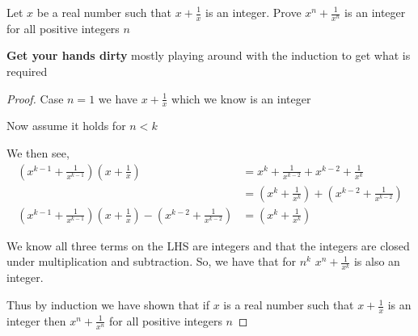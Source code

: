 \documentclass[11pt]{article}
\newenvironment{problem}[2][Problem\!]{\begin{trivlist}
\item[\hskip \labelsep {\bfseries #1}\hskip \labelsep {\bfseries #2}]}{\end{trivlist}}
\begin{document}
\begin{tcolorbox}
    \begin{problem}{IC | 9/29 | 14.}
        Let $x$ be a real number such that $x + \frac{1}{x}$ is an integer. Prove $x^n + \frac{1}{x^n}$ is an integer for all positive integers $n$
    \end{problem}
    \textbf{Get your hands dirty} mostly playing around with the induction to get what is required
\end{tcolorbox}
\begin{proof}
    Case $n = 1$ we have $x + \frac{1}{x}$ which we know is an integer

    Now assume it holds for $n < k$

    We then see,
    \begin{align*}
        (x^{k-1} + \frac{1}{x^{k-1}})(x + \frac{1}{x}) &= x^k + \frac{1}{x^{k-2}} + x^{k-2} + \frac{1}{x^k} \\
        &= (x^k + \frac{1}{x^k})+(x^{k-2}+\frac{1}{x^{k-2}}) \\
        (x^{k-1} + \frac{1}{x^{k-1}})(x + \frac{1}{x}) - (x^{k-2}+\frac{1}{x^{k-2}}) &= (x^k + \frac{1}{x^k})
    \end{align*}

    We know all three terms on the LHS are integers and that the integers are closed under multiplication and subtraction. So, we have that for $n ^k$ $x^n + \frac{1}{x^k}$ is also an integer. 

    Thus by induction we have shown that if $x$ is a real number such that $x + \frac{1}{x}$ is an integer then $x^n + \frac{1}{x^n}$ for all positive integers $n$ 
\end{proof}
\end{document}
